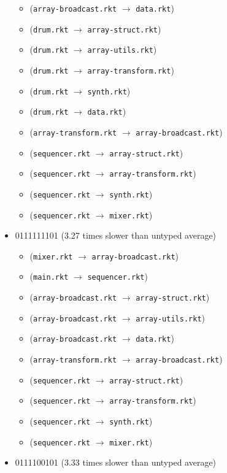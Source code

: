 \documentclass{article}
\newcommand{\mono}[1]{\texttt{#1}}
\begin{document}
\begin{itemize}
\begin{itemize}
  \item (\mono{array-broadcast.rkt} $\rightarrow$ \mono{data.rkt})
  \item (\mono{drum.rkt} $\rightarrow$ \mono{array-struct.rkt})
  \item (\mono{drum.rkt} $\rightarrow$ \mono{array-utils.rkt})
  \item (\mono{drum.rkt} $\rightarrow$ \mono{array-transform.rkt})
  \item (\mono{drum.rkt} $\rightarrow$ \mono{synth.rkt})
  \item (\mono{drum.rkt} $\rightarrow$ \mono{data.rkt})
  \item (\mono{array-transform.rkt} $\rightarrow$ \mono{array-broadcast.rkt})
  \item (\mono{sequencer.rkt} $\rightarrow$ \mono{array-struct.rkt})
  \item (\mono{sequencer.rkt} $\rightarrow$ \mono{array-transform.rkt})
  \item (\mono{sequencer.rkt} $\rightarrow$ \mono{synth.rkt})
  \item (\mono{sequencer.rkt} $\rightarrow$ \mono{mixer.rkt})
  \end{itemize}
\item 0111111101 (3.27 times slower than untyped average)
  \begin{itemize}
  \item (\mono{mixer.rkt} $\rightarrow$ \mono{array-broadcast.rkt})
  \item (\mono{main.rkt} $\rightarrow$ \mono{sequencer.rkt})
  \item (\mono{array-broadcast.rkt} $\rightarrow$ \mono{array-struct.rkt})
  \item (\mono{array-broadcast.rkt} $\rightarrow$ \mono{array-utils.rkt})
  \item (\mono{array-broadcast.rkt} $\rightarrow$ \mono{data.rkt})
  \item (\mono{array-transform.rkt} $\rightarrow$ \mono{array-broadcast.rkt})
  \item (\mono{sequencer.rkt} $\rightarrow$ \mono{array-struct.rkt})
  \item (\mono{sequencer.rkt} $\rightarrow$ \mono{array-transform.rkt})
  \item (\mono{sequencer.rkt} $\rightarrow$ \mono{synth.rkt})
  \item (\mono{sequencer.rkt} $\rightarrow$ \mono{mixer.rkt})
  \end{itemize}
\item 0111100101 (3.33 times slower than untyped average)

\end{itemize}
\end{document}
